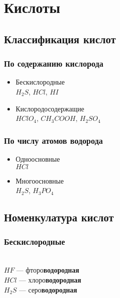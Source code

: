 \newpage
\section{Кислоты}
\subsection{Классификация кислот}
\subsubsection{По содержанию кислорода}
\begin{itemize}
    \item Бескислородные\\
        $H_2S$, $HCl$, $HI$

    \item Кислородосодержащие\\
        $HClO_4$, $CH_3COOH$, $H_2SO_4$
\end{itemize}


\subsubsection{По числу атомов водорода}
\begin{itemize}
    \item Одноосновные\\
        $HCl$

    \item Многоосновные\\
        $H_2S$, $H_3PO_4$

\end{itemize}



\subsection{Номенкулатура кислот}
\subsubsection{Бескислородные}
\\
$HF$   --- фторо\textbf{водородная}\\
$HCl$  --- хлоро\textbf{водородная}\\
$H_2S$ --- серо\textbf{водородная}


